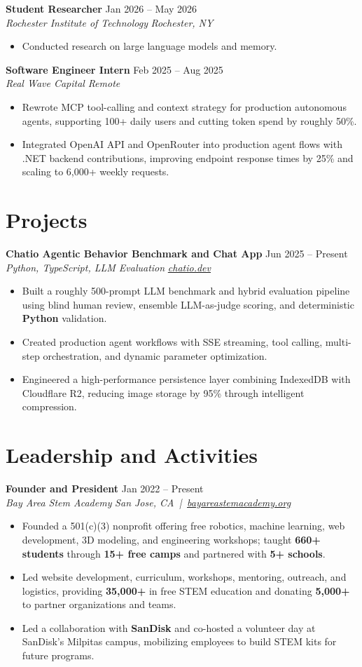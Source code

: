 \documentclass[10pt,letterpaper]{article}
\newif\ifresumeFirstRole
\newcommand{\resumeRole}[4]{%
  \ifresumeFirstRole
    \global\resumeFirstRolefalse
  \else
    \vspace{0pt plus 1fill}%
  \fi
  \textbf{#1} \hfill #2\\
  \textit{#3} \hfill \textit{#4}
}
\begin{document}
\resumeRole{Student Researcher}{Jan 2026 -- May 2026}{Rochester Institute of Technology}{Rochester, NY}
\begin{itemize}
  \item Conducted research on large language models and memory.
\end{itemize}

\resumeRole{Software Engineer Intern}{Feb 2025 -- Aug 2025}{Real Wave Capital}{Remote}
\begin{itemize}
  \item Rewrote MCP tool-calling and context strategy for production autonomous agents, supporting 100+ daily users and cutting token spend by roughly 50\%.
  \item Integrated OpenAI API and OpenRouter into production agent flows with .NET backend contributions, improving endpoint response times by 25\% and scaling to 6,000+ weekly requests.
\end{itemize}

\section*{Projects}
\resumeRole{Chatio Agentic Behavior Benchmark and Chat App}{Jun 2025 -- Present}{Python, TypeScript, LLM Evaluation}{\href{https://chatio.dev}{chatio.dev}}
\begin{itemize}
  \item Built a roughly 500-prompt LLM benchmark and hybrid evaluation pipeline using blind human review, ensemble LLM-as-judge scoring, and deterministic \textbf{Python} validation.
  \item Created production agent workflows with SSE streaming, tool calling, multi-step orchestration, and dynamic parameter optimization.
  \item Engineered a high-performance persistence layer combining IndexedDB with Cloudflare R2, reducing image storage by 95\% through intelligent compression.
\end{itemize}

\section*{Leadership and Activities}
\resumeRole{Founder and President}{Jan 2022 -- Present}{Bay Area Stem Academy}{San Jose, CA \,|\, \href{https://bayareastemacademy.org}{bayareastemacademy.org}}
\begin{itemize}
  \item Founded a 501(c)(3) nonprofit offering free robotics, machine learning, web development, 3D modeling, and engineering workshops; taught \textbf{660+ students} through \textbf{15+ free camps} and partnered with \textbf{5+ schools}.
  \item Led website development, curriculum, workshops, mentoring, outreach, and logistics, providing \textbf{\textdollar{}35,000+} in free STEM education and donating \textbf{\textdollar{}5,000+} to partner organizations and teams.
  \item Led a collaboration with \textbf{SanDisk} and co-hosted a volunteer day at SanDisk's Milpitas campus, mobilizing employees to build STEM kits for future programs.
\end{itemize}
\end{document}
